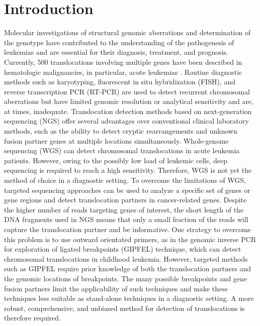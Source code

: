 \section{Introduction}\label{introduction}
Molecular investigations of structural genomic aberrations and determination of the genotype have contributed to the understanding of the pathogenesis of leukemias and are essential for their diagnosis, treatment, and prognosis\cite{Shaffer_2012}.
Currently, 500 translocations involving multiple genes have been described in hematologic malignancies, in particular, acute leukemias \cite{Mitelman_2017}. 
Routine diagnostic methods such as karyotyping, fluorescent in situ hybridization (FISH), and reverse transcription PCR (RT-PCR) are used to detect recurrent chromosomal aberrations but have limited genomic resolution or analytical sensitivity and are, at times, inadequate\cite{Sandberg_2010}.
Translocation detection methods based on next-generation sequencing (NGS) offer several advantages over conventional clinical laboratory methods, such as the ability to detect cryptic rearrangements and unknown fusion partner genes at multiple locations simultaneously\cite{Mertens_2015}.
Whole-genome sequencing (WGS) can detect chromosomal translocations in acute leukemia patients\cite{Welch_2011}. 
However, owing to the possibly low load of leukemic cells, deep sequencing is required to reach a high sensitivity.
Therefore, WGS is not yet the method of choice in a diagnostic setting. 
To overcome the limitations of WGS, targeted sequencing approaches can be used to analyze a specific set of genes or gene regions and detect translocation partners in cancer-related genes\cite{Duncavage_2012}.
Despite the higher number of reads targeting genes of interest, the short length of the DNA fragments used in NGS means that only a small fraction of the reads will capture the translocation partner and be informative.
One strategy to overcome this problem is to use outward orientated primers, as in the genomic inverse PCR for exploration of ligated breakpoints (GIPFEL) technique, which can detect chromosomal translocations in childhood leukemia\cite{Fueller_2014}.
However, targeted methods such as GIPFEL require prior knowledge of both the translocation partners and the genomic locations of breakpoints. 
The many possible breakpoints and gene fusion partners limit the applicability of such techniques and make these techniques less suitable as stand-alone techniques in a diagnostic setting. 
A more robust, comprehensive, and unbiased method for detection of translocations is therefore required. 
